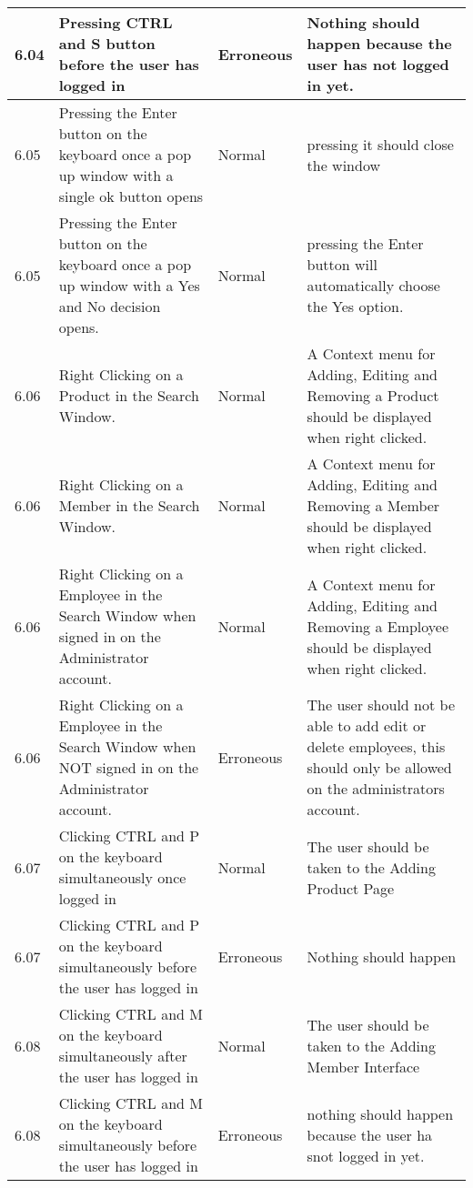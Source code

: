 \begin{flushleft}
\begin{longtable}{|p{1.5cm}|p{2.5cm}|p{2cm}|p{4.5cm}|}
	\rowcolor{light-grey}6.04 & Pressing CTRL and S button before the user has logged in & Erroneous & Nothing should happen because the user has not logged in yet. \\ \hline
	\rowcolor{light-grey}6.05 &  Pressing the Enter button on the keyboard once a pop up window with a single ok button opens & Normal & pressing it should close the window\\ \hline
	\rowcolor{light-grey}6.05 &  Pressing the Enter button on the keyboard once a pop up window with a Yes and No decision opens. & Normal & pressing the Enter button will automatically choose the Yes option. \\ \hline
	\rowcolor{light-grey}6.06 & Right Clicking on a Product in the Search Window. & Normal & A Context menu for Adding, Editing and Removing a Product should be displayed when right clicked.\\ \hline
	\rowcolor{light-grey}6.06 & Right Clicking on a Member in the Search Window. & Normal & A Context menu for Adding, Editing and Removing a Member should be displayed when right clicked.\\ \hline
	\rowcolor{light-grey}6.06 & Right Clicking on a Employee in the Search Window when signed in on the Administrator account. & Normal & A Context menu for Adding, Editing and Removing a Employee should be displayed when right clicked.\\ \hline
	\rowcolor{light-grey}6.06 & Right Clicking on a Employee in the Search Window when NOT signed in on the Administrator account. & Erroneous & The user should not be able to add edit or delete employees, this should only be allowed on the administrators account. \\ \hline
	\rowcolor{light-grey} 6.07 & Clicking CTRL and P on the keyboard simultaneously once logged in & Normal & The user should be taken to the Adding Product Page \\ \hline
	\rowcolor{light-grey} 6.07 & Clicking CTRL and P on the keyboard simultaneously before the user has logged in & Erroneous & Nothing should happen\\ \hline
	\rowcolor{light-grey} 6.08 & Clicking CTRL and M on the keyboard simultaneously after the user has logged in & Normal & The user should be taken to the Adding Member Interface \\ \hline
	\rowcolor{light-grey} 6.08 & Clicking CTRL and M on the keyboard simultaneously before the user has logged in & Erroneous & nothing should happen because the user ha snot logged in yet. \\ \hline

\end{longtable}
\end{flushleft}
